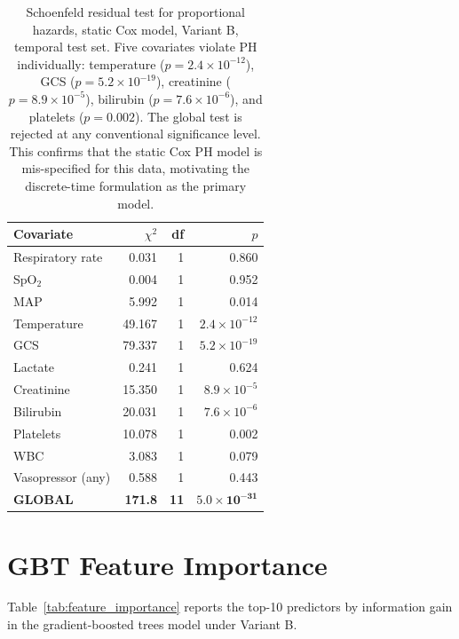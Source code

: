\begin{table}[H]
  \centering
  \begin{tabular}{lrrr}
    \toprule
    \textbf{Covariate} & \textbf{$\chi^2$} & \textbf{df} & \textbf{$p$} \\
    \midrule
    Respiratory rate & 0.031 & 1 & 0.860 \\
    SpO$_2$          & 0.004 & 1 & 0.952 \\
    MAP              & 5.992 & 1 & 0.014 \\
    Temperature      & 49.167 & 1 & $2.4 \times 10^{-12}$ \\
    GCS              & 79.337 & 1 & $5.2 \times 10^{-19}$ \\
    Lactate          & 0.241 & 1 & 0.624 \\
    Creatinine       & 15.350 & 1 & $8.9 \times 10^{-5}$ \\
    Bilirubin        & 20.031 & 1 & $7.6 \times 10^{-6}$ \\
    Platelets        & 10.078 & 1 & 0.002 \\
    WBC              & 3.083 & 1 & 0.079 \\
    Vasopressor (any)& 0.588 & 1 & 0.443 \\
    \textbf{GLOBAL}  & \textbf{171.8} & \textbf{11}
      & $\mathbf{5.0 \times 10^{-31}}$ \\
    \bottomrule
  \end{tabular}
  \caption{Schoenfeld residual test for proportional hazards, static Cox model,
  Variant B, temporal test set. Five covariates violate PH individually:
  temperature ($p = 2.4 \times 10^{-12}$), GCS ($p = 5.2 \times 10^{-19}$),
  creatinine ($p = 8.9 \times 10^{-5}$), bilirubin ($p = 7.6 \times 10^{-6}$),
  and platelets ($p = 0.002$). The global test is rejected at any conventional
  significance level. This confirms that the static Cox PH model is mis-specified
  for this data, motivating the discrete-time formulation as the primary model.}
  \label{tab:schoenfeld}
\end{table}

\section{GBT Feature Importance}
\label{sec:feature_importance}

Table~\ref{tab:feature_importance} reports the top-10 predictors by information
gain in the gradient-boosted trees model under Variant B.

